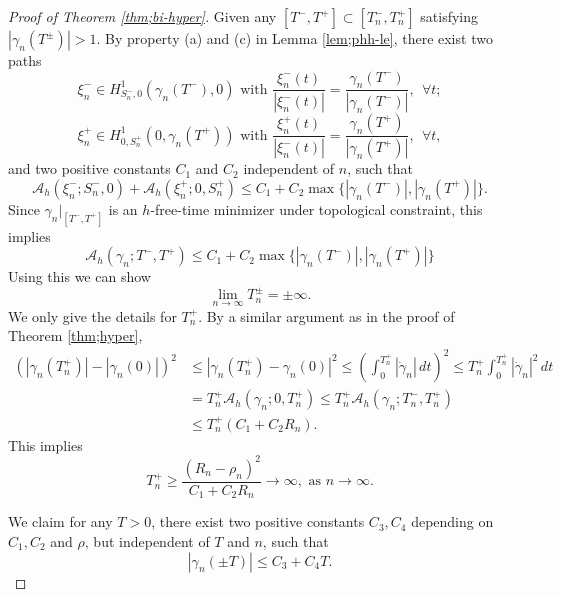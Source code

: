 \documentclass[11pt]{amsart}
\newcommand{\A}{\mathcal A}
\newcommand{\gm}{\gamma}
\theoremstyle{plain}
\theoremstyle{definition}
\theoremstyle{remark}
\begin{document}
\begin{proof}[Proof of Theorem \ref{thm;bi-hyper}]
Given any $[T^{-}, T^+] \subset [T^-_n, T_n^+]$ satisfying $|\gm_n(T^{\pm})| >1$. By property (a) and (c) in Lemma \ref{lem;phh-le}, there exist two paths
$$ \xi^-_n \in H^1_{S_n^-, 0}(\gm_n(T^-), 0) \text{ with } \frac{\xi^-_n(t)}{|\xi^-_n(t)|} = \frac{\gm_n(T^-)}{|\gm_n(T^-)|},\, \; \forall t; $$
$$ \xi^+_n \in H^1_{0, S_n^+}(0, \gm_n(T^+)) \text{ with } \frac{\xi^+_n(t)}{|\xi^-_n(t)|} = \frac{\gm_n(T^+)}{|\gm_n(T^+)|},\, \; \forall t,$$
and two positive constants $C_1$ and $C_2$ independent of $n$, such that 
$$ \A_h(\xi_n^-; S_n^-, 0) + \A_h(\xi_n^+; 0, S^+_n) \le C_1 + C_2\max\{|\gm_n(T^-)|, |\gm_n(T^+)| \}. $$
Since  $\gm_n|_{[T^-, T^+]}$ is an $h$-free-time minimizer under topological constraint, this implies 
\begin{equation}
	\label{eq;phih-le-2}  
		\A_h(\gm_n; T^-, T^+) \le C_1 + C_2\max\{|\gm_n(T^-)|, |\gm_n(T^+)| \}
\end{equation}
Using this we can show 
$$ \lim_{n \to \infty}T_n^{\pm} = \pm \infty. $$
We only give the details for $T^{+}_n$. By a similar argument as in the proof of Theorem \ref{thm;hyper},
\begin{equation} \label{eq;Tn+}
	\begin{aligned}
		\left( |\gm_n(T_n^+)| - |\gm_n(0)| \right)^2 & \le |\gm_n(T_n^+) - \gm_n(0)|^2 \le \left( \int_0^{T^+_n} |\dot{\gm}_n| \,dt \right)^2  \le T_n^+ \int_0^{T_n^+} |\dot{\gm}_n|^2 \,dt \\
		&  = T_n^+ \A_h(\gm_n; 0, T^+_n)  \le T_n^+\A_h(\gm_n; T_n^-, T_n^+) \\
		& \le T_n^+(C_1 + C_2 R_n).
	\end{aligned}
\end{equation}
This implies 
$$ T_n^+ \ge \frac{(R_n - \rho_n)^2}{C_1 + C_2 R_n} \to \infty, \text{ as } n \to \infty. $$

We claim for any $T>0$, there exist two positive constants $C_3, C_4$ depending on $C_1, C_2$ and $\rho$, but independent of $T$ and $n$, such that
\begin{equation} \label{eq;gmn-T}
	 |\gm_n(\pm T)|  \le C_3 + C_4 T. 
\end{equation}


\end{proof}
\end{document}

